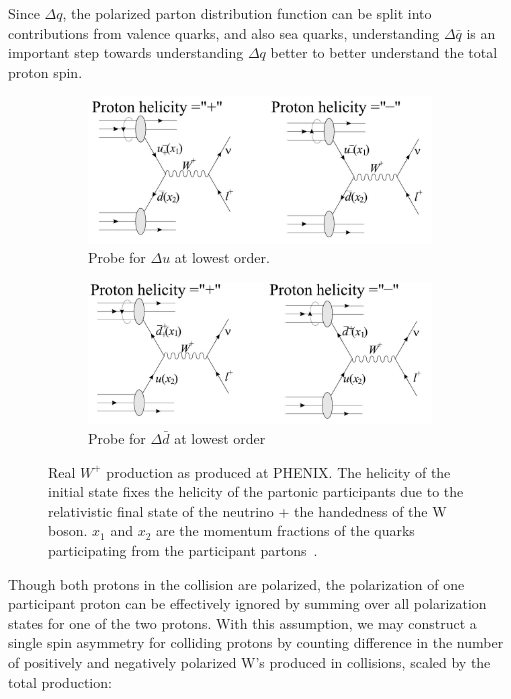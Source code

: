 Since $\Delta q$, the polarized parton distribution function can be split into
contributions from valence quarks, and also sea quarks, understanding $\Delta
\bar{q}$ is an important step towards understanding $\Delta q$ better to better
understand the total proton spin.

\begin{figure}[ht]
  \centering
  \begin{subfigure}[b]{\textwidth}
    \centering
    \includegraphics[width=0.8\linewidth]{./figures/w_plus_u_probe.jpg}
    \caption{
      Probe for $\Delta u$ at lowest order.
    }
    \label{fig:u_probe}
  \end{subfigure}
  \begin{subfigure}[t]{\textwidth}
    \centering
    \includegraphics[width=0.8\linewidth]{./figures/w_plus_dbar_probe.jpg}
    \caption{
      Probe for $\Delta\bar{d}$ at lowest order
    }
    \label{fig:dbar_probe}
  \end{subfigure}
  \caption{
    Real $W^+$ production as produced at PHENIX. The helicity of the initial
    state fixes the helicity of the partonic participants due to the
    relativistic final state of the neutrino + the handedness of the W boson.
    $x_1$ and $x_2$ are the momentum fractions of the quarks participating from
    the participant partons~\cite{Aidala2005}. 
  }
  \label{fig:w_probe_leading_order}
\end{figure}

Though both protons in the collision are polarized, the polarization of one
participant proton can be effectively ignored by summing over all polarization
states for one of the two protons. With this assumption, we may construct a
single spin asymmetry for colliding protons by counting difference in the number
of positively and negatively polarized W's produced in collisions, scaled by the
total production:

